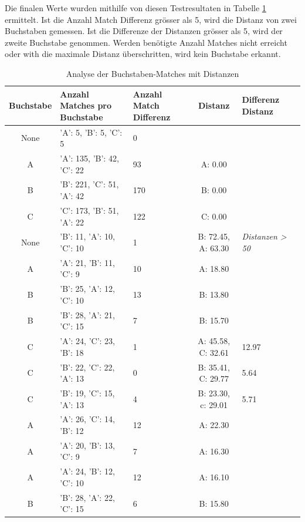 Die finalen Werte wurden mithilfe von diesen Testresultaten in Tabelle \ref{letter-matches-orb} ermittelt. Ist die Anzahl Match Differenz grösser als 5, wird die Distanz von zwei Buchstaben gemessen.  Ist die Differenze der Distanzen grösser als 5, wird der zweite Buchstabe genommen. Werden benötigte Anzahl Matches nicht erreicht oder with die maximale Distanz überschritten, wird kein Buchstabe erkannt.

\begin{table}[H]
\centering
\small
\begin{tabularx}{\textwidth}{|c|X|X|c|X|c|}
\hline
\textbf{Buchstabe} & \textbf{Anzahl Matches pro Buchstabe} & \textbf{Anzahl Match Differenz} & \textbf{Distanz} & \textbf{Differenz Distanz} \\
\hline
None & {'A': 5, 'B': 5, 'C': 5} & 0 &  &  \\
\hline
A & {'A': 135, 'B': 42, 'C': 22} & 93 & A: 0.00 &  \\
\hline
B & {'B': 221, 'C': 51, 'A': 42} & 170 & B: 0.00 &  \\
\hline
C & {'C': 173, 'B': 51, 'A': 22} & 122 & C: 0.00 &  \\
\hline
None & {'B': 11, 'A': 10, 'C': 10} & 1 & B: 72.45, A: 63.30 & \textit{Distanzen > 50}\\
\hline
A & {'A': 21, 'B': 11, 'C': 9} & 10 & A: 18.80 &  \\
\hline
B & {'B': 25, 'A': 12, 'C': 10} & 13 & B: 13.80 &  \\
\hline
B & {'B': 28, 'A': 21, 'C': 15} & 7 & B: 15.70 &  \\
\hline
C & {'A': 24, 'C': 23, 'B': 18} & 1 & A: 45.58, C: 32.61 & 12.97 \\
\hline
C & {'B': 22, 'C': 22, 'A': 13} & 0 & B: 35.41, C: 29.77 & 5.64 \\
\hline
C & {'B': 19, 'C': 15, 'A': 13} & 4 & B: 23.30, c: 29.01 & 5.71 \\
\hline
A & {'A': 26, 'C': 14, 'B': 12} & 12 & A: 22.30 &  \\
\hline
A & {'A': 20, 'B': 13, 'C': 9} & 7 & A: 16.30 &  \\
\hline
A & {'A': 24, 'B': 12, 'C': 10} & 12 & A: 16.10 &  \\
\hline
B & {'B': 28, 'A': 22, 'C': 15} & 6 & B: 15.80 &  \\
\hline
\end{tabularx}
\caption{Analyse der Buchstaben-Matches mit Distanzen}
\label{letter-matches-orb}
\end{table}

